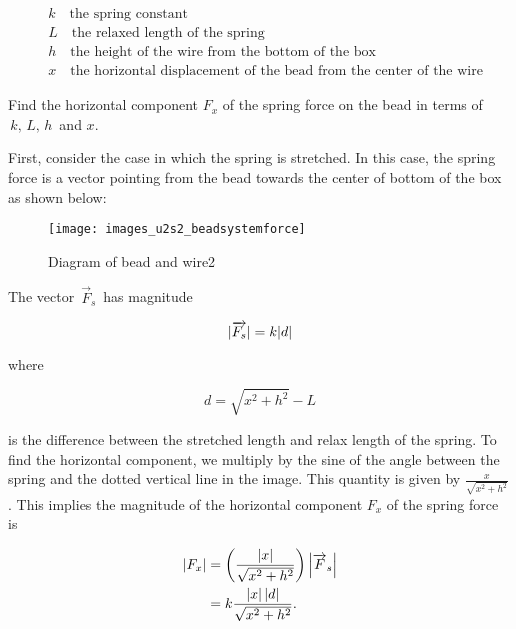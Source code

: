 \begin{align*}
  &k \quad \text{the spring constant} \\
  &L \quad \text{the relaxed length of the spring} \\
  &h \quad \text{the height of the wire from the bottom of the box} \\
  &x \quad \text{the horizontal displacement of the bead from the center of the wire}
\end{align*}

Find the horizontal component $F_x$ of the spring force on the bead in terms
of $\,k,\, L,\, h\,$ and $x$.

\clearpage

First, consider the case in which the spring is stretched.
In this case, the spring force is a vector pointing
from the bead towards the center of bottom of the box as shown below:

\begin{figure}[ht!]
  \centering
  \texttt{[image: images\_u2s2\_beadsystemforce]}
  \caption{Diagram of bead and wire2}
\end{figure}

The vector $\, \overrightarrow {F}_ s\,$ has magnitude

\begin{equation*}
  \displaystyle  \displaystyle |\overrightarrow {F_ s}|
  \displaystyle =
  \displaystyle  k|d|
\end{equation*}

where

\begin{equation*}
  \displaystyle d
  \displaystyle =
  \displaystyle  \sqrt {x^2+h^2}-L
\end{equation*}

is the difference between the stretched length and relax length of the spring.
To find the horizontal component,
we multiply by the sine of the angle between the spring and the dotted vertical line in the image.
This quantity is given by $\displaystyle \frac{x}{\sqrt {x^2+h^2}}$.
This implies the magnitude of the horizontal component $F_x$ of the spring force is

\begin{align*}
  \displaystyle  \displaystyle |F_ x|
  \displaystyle &=  \displaystyle  \left(\frac{|x|}{\sqrt {x^2+h^2}}\right)
                  \left|\overrightarrow {F}_ s\right| \\
  \displaystyle &= \displaystyle  k \frac{|x|\, |d|}{\sqrt {x^2+h^2}}.                  
\end{align*}

